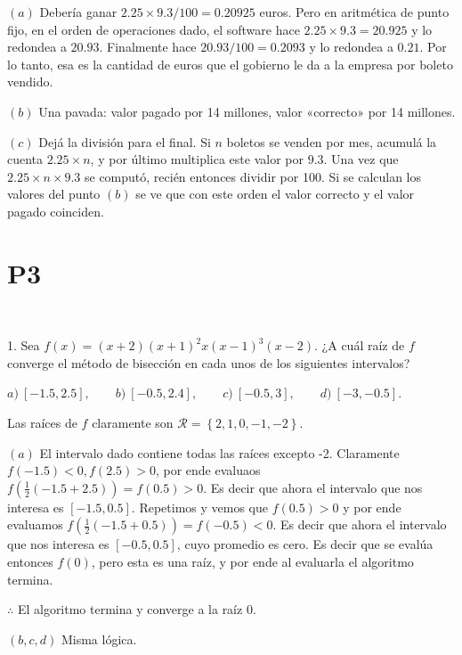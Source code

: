 \documentclass[12pt]{article}
\begin{document}
$(a)$ Debería ganar $2.25 \times 9.3 / 100 = 0.20925$ euros. Pero en aritmética
de punto fijo, en el orden de operaciones dado, el software hace $2.25 \times
9.3 = 20.925$ y lo redondea a $20.93$. Finalmente hace $20.93 / 100 = 0.2093$ y
lo redondea a $0.21$. Por lo tanto, esa es la cantidad de euros que el gobierno le da a
la empresa por boleto vendido. 

$(b)$ Una pavada: valor pagado por 14 millones, valor «correcto» por 14
millones. 

$(c)$ Dejá la división para el final. Si $n$ boletos se venden por mes, acumulá
la cuenta $2.25 \times n$, y por último multiplica este valor por $9.3$. Una vez
que $2.25 \times n \times 9.3$ se computó, recién entonces dividir por 100. Si
se calculan los valores del punto $(b)$ se ve que con este orden el valor
correcto y el valor pagado coinciden.

\pagebreak 

\section{P3}

~

\begin{myframe}
    1. Sea $f(x) = (x + 2)(x + 1)^2 x (x - 1)^3 (x - 2)$. ¿A cuál raíz de $f$ converge el método de bisección en cada unos de los siguientes intervalos?

\vspace{0.4cm}
\noindent $a) \ [-1.5, 2.5], \qquad b) \ [-0.5, 2.4], \qquad c) \ [-0.5, 3], \qquad d) \ [-3, -0.5].$
\end{myframe}

Las raíces de $f$ claramente son $\mathcal{R} = \left\{ 2, 1, 0, -1, -2 \right\}
$. 

$(a)$ El intervalo dado contiene todas las raíces excepto -2. Claramente
$f(-1.5) < 0, f(2.5) > 0$, por ende evaluaos $f\left( \frac{1}{2}\left( -1.5 +
2.5 \right)  \right) = f(0.5) > 0$. Es decir que ahora el intervalo que nos
interesa es $[-1.5, 0.5]$. Repetimos y vemos que $f(0.5) > 0$ y por ende
evaluamos 
$f\left( \frac{1}{2}\left( -1.5 + 0.5 \right)  \right) = f\left( -0.5 \right) <
0$. Es decir que ahora el intervalo que nos interesa es $[-0.5, 0.5]$, cuyo
promedio es cero. Es decir que se evalúa entonces $f(0)$, pero esta es una raíz,
y por ende al evaluarla el algoritmo termina. 

$\therefore $ El algoritmo termina y converge a la raíz $0$.

$(b, c, d)$ Misma lógica.
\end{document}
